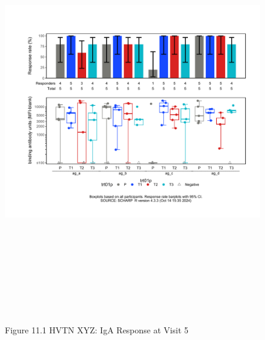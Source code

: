 \documentclass[12pt]{article}
\begin{document}
\begin{figure}[H]

{\centering \includegraphics[width=8.75in,height=7.25in]{test_cases_files/figure-latex/unnamed-chunk-22-1} 

}

\caption[Figure 11.1 boxplot (pos. response boxplots)]{Figure 11.1 HVTN XYZ: IgA Response at Visit 5}\label{fig:unnamed-chunk-22}
\end{figure}
\clearpage
\end{document}
